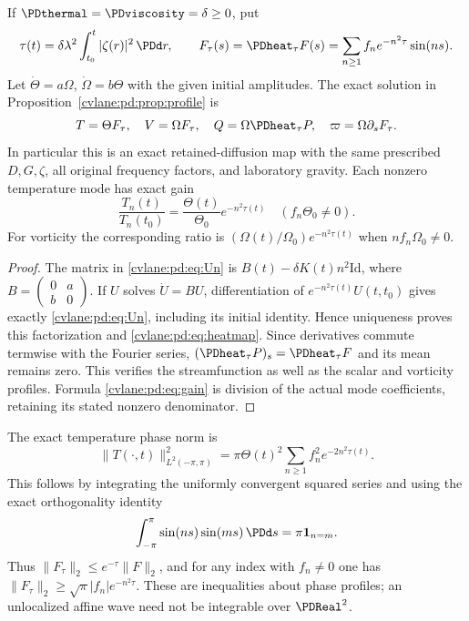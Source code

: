 \begin{cvlanepdproposition}\label{cvlane:pd:prop:heat}
If $\PDthermal=\PDviscosity=\delta\geq0$, put
\begin{equation}\label{cvlane:pd:eq:heattime}
 \tau(t)=\delta\lambda^2\int_{t_0}^t|\zeta(r)|^2\,\PDd r,
 \qquad
 F_{\tau}(s)=\PDheat_{\tau}F(s)=\sum_{n\geq1}f_ne^{-n^2\tau}\sin(ns).
\end{equation}
Let $\dot\Theta=a\Omega$, $\dot\Omega=b\Theta$ with the given initial
amplitudes. The exact solution in Proposition~\ref{cvlane:pd:prop:profile} is
\begin{equation}\label{cvlane:pd:eq:heatmap}
 T=\Theta F_\tau,\quad V=\Omega F_\tau,\quad
 Q=\Omega\PDheat_\tau P,
 \quad \varpi=\Omega\partial_sF_\tau.
\end{equation}
In particular this is an exact retained-diffusion map with the same
prescribed $D,G,\zeta$, all original frequency factors, and laboratory
gravity. Each nonzero temperature mode has exact gain
\begin{equation}\label{cvlane:pd:eq:gain}
 \frac{T_n(t)}{T_n(t_0)}
   =\frac{\Theta(t)}{\Theta_0}e^{-n^2\tau(t)}
 \quad(f_n\Theta_0\ne0).
\end{equation}
For vorticity the corresponding ratio is
$(\Omega(t)/\Omega_0)e^{-n^2\tau(t)}$ when $nf_n\Omega_0\ne0$.
\end{cvlanepdproposition}
\begin{proof}
The matrix in \eqref{cvlane:pd:eq:Un} is $B(t)-\delta K(t)n^2\mathrm{Id}$,
where $B=\left(\begin{smallmatrix}0&a\\b&0\end{smallmatrix}\right)$.
If $U$ solves $\dot U=BU$, differentiation of
$e^{-n^2\tau(t)}U(t,t_0)$ gives exactly \eqref{cvlane:pd:eq:Un}, including its
initial identity. Hence uniqueness proves this factorization and
\eqref{cvlane:pd:eq:heatmap}. Since derivatives commute termwise with the Fourier
series, $(\PDheat_\tau P)_s=\PDheat_\tau F$ and its mean remains zero.
This verifies the streamfunction as well as the scalar and vorticity
profiles. Formula \eqref{cvlane:pd:eq:gain} is division of the actual mode
coefficients, retaining its stated nonzero denominator.
\end{proof}

The exact temperature phase norm is
\begin{equation}\label{cvlane:pd:eq:norm}
 \|T(\cdot,t)\|_{L^2(-\pi,\pi)}^2
 =\pi\Theta(t)^2\sum_{n\geq1}f_n^2e^{-2n^2\tau(t)}.
\end{equation}
This follows by integrating the uniformly convergent squared series and
using the exact orthogonality identity
\[
 \int_{-\pi}^{\pi}\sin(ns)\sin(ms)\,\PDd s=\pi\mathbf1_{n=m}.
\]
Thus $\|F_\tau\|_2\leq e^{-\tau}\|F\|_2$, and for any index with
$f_n\ne0$ one has $\|F_\tau\|_2\geq\sqrt\pi|f_n|e^{-n^2\tau}$.
These are inequalities about phase profiles; an unlocalized affine wave
need not be integrable over $\PDReal^2$.

